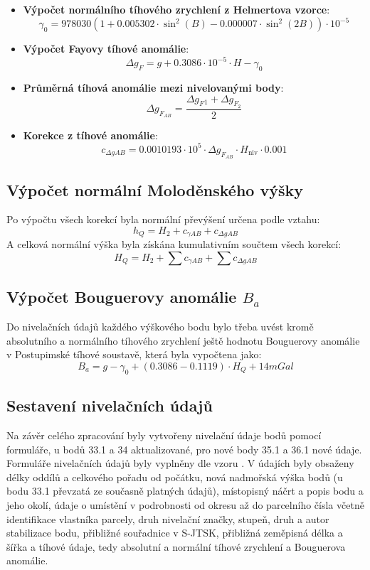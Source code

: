 \begin{itemize}
    \item \textbf{Výpočet normálního tíhového zrychlení z Helmertova vzorce}: 
    \[
    \gamma_0 = 978030 \left(1 + 0.005302 \cdot \sin^2(B) - 0.000007 \cdot \sin^2(2B) \right) \cdot 10^{-5}
    \]
    \item \textbf{Výpočet Fayovy tíhové anomálie}:
    \[
    \Delta g_F = g + 0.3086 \cdot 10^{-5} \cdot H - \gamma_0
    \]
    \item \textbf{Průměrná tíhová anomálie mezi nivelovanými body}:
    \[
    \Delta g_{F_{AB}} = \frac{\Delta g_F{_{1}} + \Delta g_{F_{2}}}{2}
    \]
    \item \textbf{Korekce z tíhové anomálie}:
    \[
    c_{\Delta g AB} = 0.0010193 \cdot 10^5 \cdot \Delta g_{F_{AB}} \cdot H_{\text{niv}} \cdot 0.001
    \]
\end{itemize}

\subsection*{Výpočet normální Moloděnského výšky}
Po výpočtu všech korekcí byla normální převýšení určena podle vztahu:
\[
h_Q = H_{2} + c_{\gamma AB} + c_{\Delta g AB}
\]
A celková normální výška byla získána kumulativním součtem všech korekcí:
\[
H_Q = H_{2} + \sum c_{\gamma AB} + \sum c_{\Delta g AB}
\]

\subsection{Výpočet Bouguerovy anomálie \(B_a\)}
Do nivelačních údajů každého výškového bodu bylo třeba uvést kromě absolutního a normálního tíhového zrychlení ještě hodnotu Bouguerovy anomálie v Postupimské tíhové soustavě, která byla vypočtena jako:
\[
B_a = g - \gamma_0 + (0.3086 - 0.1119)\cdot H_Q + 14 mGal
\]

\subsection{Sestavení nivelačních údajů}
Na závěr celého zpracování byly vytvořeny nivelační údaje bodů pomocí formuláře, u bodů 33.1 a 34 aktualizované, pro nové body 35.1 a 36.1 nové údaje. Formuláře nivelačních údajů byly vyplněny dle vzoru \cite{skorepa}. V údajích byly obsaženy délky oddílů a celkového pořadu od počátku, nová nadmořská výška bodů (u bodu 33.1 převzatá ze současně platných údajů), místopisný náčrt a popis bodu a jeho okolí, údaje o umístění v podrobnosti od okresu až do parcelního čísla včetně identifikace vlastníka parcely, druh nivelační značky, stupeň, druh a autor stabilizace bodu, přibližné souřadnice v S-JTSK, přibližná zeměpisná délka a šířka a tíhové údaje, tedy absolutní a normální tíhové zrychlení a Bouguerova anomálie.